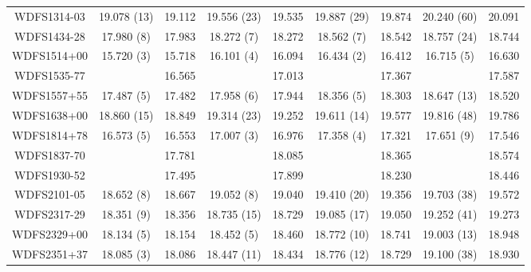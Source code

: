 \begin{table}
\begin{tabular}{ccccccccc}
WDFS1314-03 & 19.078 (13) & 19.112 & 19.556 (23) & 19.535 & 19.887 (29) & 19.874 & 20.240 (60) & 20.091 \\
WDFS1434-28 & 17.980 (8) & 17.983 & 18.272 (7) & 18.272 & 18.562 (7) & 18.542 & 18.757 (24) & 18.744 \\
WDFS1514+00 & 15.720 (3) & 15.718 & 16.101 (4) & 16.094 & 16.434 (2) & 16.412 & 16.715 (5) & 16.630 \\
WDFS1535-77 &  & 16.565 &  & 17.013 &  & 17.367 &  & 17.587 \\
WDFS1557+55 & 17.487 (5) & 17.482 & 17.958 (6) & 17.944 & 18.356 (5) & 18.303 & 18.647 (13) & 18.520 \\
WDFS1638+00 & 18.860 (15) & 18.849 & 19.314 (23) & 19.252 & 19.611 (14) & 19.577 & 19.816 (48) & 19.786 \\
WDFS1814+78 & 16.573 (5) & 16.553 & 17.007 (3) & 16.976 & 17.358 (4) & 17.321 & 17.651 (9) & 17.546 \\
WDFS1837-70 &  & 17.781 &  & 18.085 &  & 18.365 &  & 18.574 \\
WDFS1930-52 &  & 17.495 &  & 17.899 &  & 18.230 &  & 18.446 \\
WDFS2101-05 & 18.652 (8) & 18.667 & 19.052 (8) & 19.040 & 19.410 (20) & 19.356 & 19.703 (38) & 19.572 \\
WDFS2317-29 & 18.351 (9) & 18.356 & 18.735 (15) & 18.729 & 19.085 (17) & 19.050 & 19.252 (41) & 19.273 \\
WDFS2329+00 & 18.134 (5) & 18.154 & 18.452 (5) & 18.460 & 18.772 (10) & 18.741 & 19.003 (13) & 18.948 \\
WDFS2351+37 & 18.085 (3) & 18.086 & 18.447 (11) & 18.434 & 18.776 (12) & 18.729 & 19.100 (38) & 18.930 \\
\end{tabular}
\end{table}
